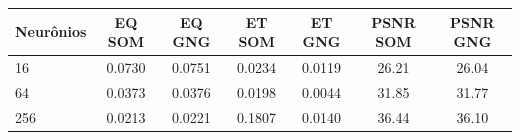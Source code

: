 \begin{tabular}{lcccccc}
\toprule
Neurônios & EQ SOM & EQ GNG & ET SOM & ET GNG & PSNR SOM & PSNR GNG\\
\midrule
16 & 0.0730 & 0.0751 & 0.0234 & 0.0119 & 26.21 & 26.04\\
64 & 0.0373 & 0.0376 & 0.0198 & 0.0044 & 31.85 & 31.77\\
256 & 0.0213 & 0.0221 & 0.1807 & 0.0140 & 36.44 & 36.10\\
\bottomrule
\end{tabular}
